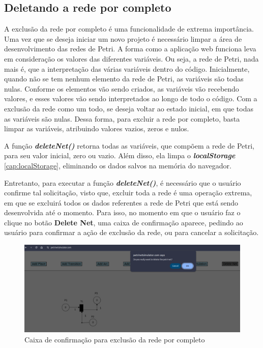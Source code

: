 \documentclass[
	12pt,				%
	openright,			%
	oneside,			%
	a4paper,			%
	english,			%
	brazil				%
	]{abntex2}
\begin{document}
\subsection*{Deletando a rede por completo} \label{cap:deleteNetFull}

A exclusão da rede por completo é uma funcionalidade de extrema importância. Uma vez que se deseja iniciar um novo projeto é necessário limpar a área de desenvolvimento das redes de Petri. A forma como a aplicação web funciona leva em consideração os valores das diferentes variáveis. Ou seja, a rede de Petri, nada mais é, que a interpretação das várias variáveis dentro do código. Inicialmente, quando não se tem nenhum elemento da rede de Petri, as variáveis são todas nulas. Conforme os elementos vão sendo criados, as variáveis vão recebendo valores, e esses valores vão sendo interpretados ao longo de todo o código. Com a exclusão da rede como um todo, se deseja voltar ao estado inicial, em que todas as variáveis são nulas. Dessa forma, para excluir a rede por completo, basta limpar as variáveis, atribuindo valores vazios, zeros e nulos. 



A função \textbf{\textit{deleteNet()}} retorna todas as variáveis, que compõem a rede de Petri, para seu valor inicial, zero ou vazio. Além disso, ela limpa o \textbf{\textit{localStorage}} \ref{cap:localStorage}, eliminando os dados salvos na memória do navegador. 

Entretanto, para executar a função \textbf{\textit{deleteNet()}}, é necessário que o usuário confirme tal solicitação, visto que, excluir toda a rede é uma operação extrema, em que se excluirá todos os dados referentes a rede de Petri que está sendo desenvolvida até o momento. Para isso, no momento em que o usuário faz o clique no botão \textbf{Delete Net}, uma caixa de confirmação aparece, pedindo ao usuário para confirmar a ação de exclusão da rede, ou para cancelar a solicitação. 

\begin{figure}[ht] 
	\centering
	\includegraphics[scale=0.4]{figuras/confirmDeleteNet.png}
	\caption[Caixa de confirmação para exclusão da rede por completo]{Caixa de confirmação para exclusão da rede por completo}
	\label{fig:confirmDeleteNet}
\end{figure}
\FloatBarrier
\end{document}
